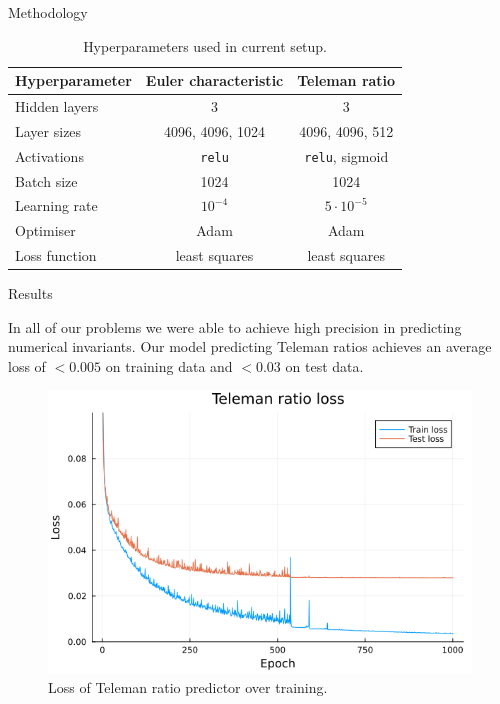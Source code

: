 \documentclass[final,20pt]{beamer}
\newlength{\colwidth}
\begin{document}
\begin{frame}[t, fragile]
\begin{columns}[t]
\begin{column}{\colwidth}
\begin{block}{Methodology}
    \begin{table}
      \centering
      \begin{tabular}{lcc}
        \toprule
        Hyperparameter & Euler characteristic & Teleman ratio\\
        \midrule
        Hidden layers             & 3                   & 3\\
        Layer sizes               & 4096, 4096, 1024    & 4096, 4096, 512\\
        Activations               & {\tt{relu}}         & {\tt{relu}}, sigmoid\\
        Batch size                & 1024                & 1024\\
        Learning rate             & $10^{-4}$           & $5 \cdot 10^{-5}$\\
        Optimiser                 & Adam                & Adam\\
        Loss function             & least squares       & least squares\\
        \bottomrule
      \end{tabular}
      \caption{Hyperparameters used in current setup.}
    \end{table}
  \end{block}

  \begin{block}{Results}

    In all of our problems we were able to achieve high precision in predicting
    numerical invariants.
    Our model predicting Teleman ratios achieves an average loss of
    $<0.005$ on training data and $<0.03$ on test data.

    \phantom{a}

    \begin{figure}
    \includegraphics{teleman-ratio-loss.png}
    \caption{Loss of Teleman ratio predictor over training.}
    \end{figure}
  \end{block}


\end{column}
\end{columns}
\end{frame}
\end{document}
